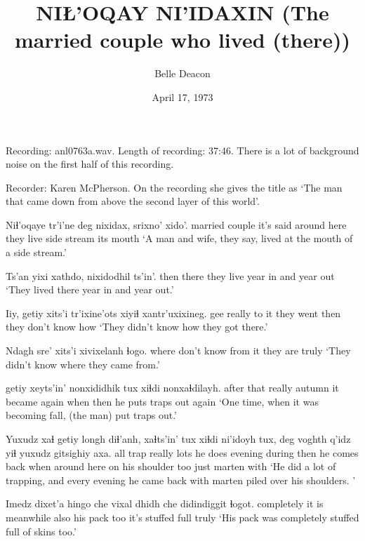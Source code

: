 \documentclass[12pt]{article}
\begin{document}
\title{NIŁ'OQAY NI'IDAXIN \newline(The married couple who lived (there))}

\author{Belle Deacon}

\date{April 17, 1973}

\maketitle

Recording: anl0763a.wav.  Length of recording: 37:46.  There is a lot of background noise
on the first half of this recording.

Recorder: Karen McPherson. On the recording she gives the title as `The man that came down from above the second layer of this world'.

\bigskip

\gll Niɬ'oqaye tr'i'ne deg nixidax, srixno' xido'. 
{married couple} {it's said} {around here} {they live} {side stream} {its mouth}
\glt `A man and wife, they say, lived at the mouth of a side stream.'
\glend

\gll Ts'an yixi xathdo, {nixidodhil ts'in'.}
then there {they live} {year in and year out}
\glt `They lived there year in and year out.'
\glend

\gll Iiy, getiy xits'i tr'ixine'ots xiyiɬ xantr'uxixineg. 
gee really {to it} {they went} then {they don't know how}
\glt `They didn't know how they got there.'
\glend

\gll Ndagh sre' xits'i xivixelanh ɬogo. 
where {don't know} {from it} {they are} truly
\glt `They didn't know where they came from.'
\glend

 getiy xeyts'in' nonxididhik tux xiɬdi nonxaɬdilayh. 
{after that} really autumn {it became again} when then {he puts traps out again}
\glt `One time, when it was becoming fall, (the man) put traps out.'
\glend

\gll Yuxudz xaɬ getiy longh diɬ'anh, xaɬts'in' tux xiɬdi ni'idoyh tux, deg {voghth q'idz} yiɬ yuxudz gitsighiy axa. 
all trap really lots {he does} evening during then {he comes back} when {around here} {on his shoulder} too just marten with
\glt `He did a lot of trapping, and every evening he came back with marten piled over his shoulders. '
\glend

\gll Imedz dixet'a hingo che {vixal dhidh} che didindiggit ɬogot. 
completely {it is} meanwhile also {his pack} too {it's stuffed full} truly
\glt `His pack was completely stuffed full of skins too.'
\glend
\end{document}
